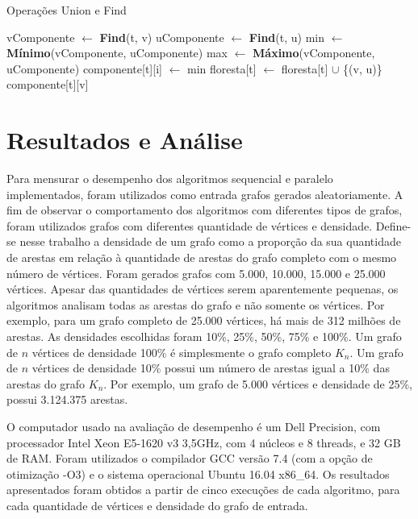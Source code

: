 \documentclass[12pt]{article}
\begin{document}
\begin{algorithm}[!htb]
    \DontPrintSemicolon
    \caption{Operações Union e Find}
    \label{alg_par2}
    {
        vComponente $\gets$ \textbf{Find}(t, v)\;
        uComponente $\gets$ \textbf{Find}(t, u)\;
        {
            min $\gets$ \textbf{Mínimo}(vComponente, uComponente)\;
		    max $\gets$ \textbf{Máximo}(vComponente, uComponente)\;
            {
                {
                    componente[t][i] $\gets$ min\;
                }
            }
            floresta[t] $\gets$ floresta[t] $\cup$ \{(v, u)\}\;
        }
    }
    {
        \Return componente[t][v]\;
    }
\end{algorithm}

\section{Resultados e Análise}
\label{resultados}

Para mensurar o desempenho dos algoritmos sequencial e paralelo implementados, foram utilizados como entrada grafos gerados aleatoriamente. A fim de observar o comportamento dos algoritmos com diferentes tipos de grafos, foram utilizados grafos com diferentes quantidade de vértices e densidade. Define-se nesse trabalho a densidade de um grafo como a proporção da sua quantidade de arestas em relação à quantidade de arestas do grafo completo com o mesmo número de vértices. Foram gerados grafos com 5.000, 10.000, 15.000 e 25.000 vértices. Apesar das quantidades de vértices serem aparentemente pequenas, os algoritmos analisam todas as arestas do grafo e não somente os vértices. Por exemplo, para um grafo completo de 25.000 vértices, há mais de 312 milhões de arestas. As densidades escolhidas foram 10\%, 25\%, 50\%, 75\% e 100\%. Um grafo de $n$ vértices de densidade 100\% é simplesmente o grafo completo $K_n$. Um grafo de $n$ vértices de densidade 10\% possui um número de arestas igual a 10\% das arestas do grafo $K_n$. Por exemplo, um grafo de 5.000 vértices e densidade de 25\%, possui 3.124.375 arestas.

O computador usado na avaliação de desempenho é um Dell Precision, com processador Intel Xeon E5-1620 v3 3,5GHz, com 4 núcleos e 8 threads, e 32 GB de RAM. Foram utilizados o compilador GCC versão 7.4 (com a opção de otimização -O3) e o sistema operacional Ubuntu 16.04 x86\_64. Os resultados apresentados foram obtidos a partir de cinco execuções de cada algoritmo, para cada quantidade de vértices e densidade do grafo de entrada.
\end{document}
